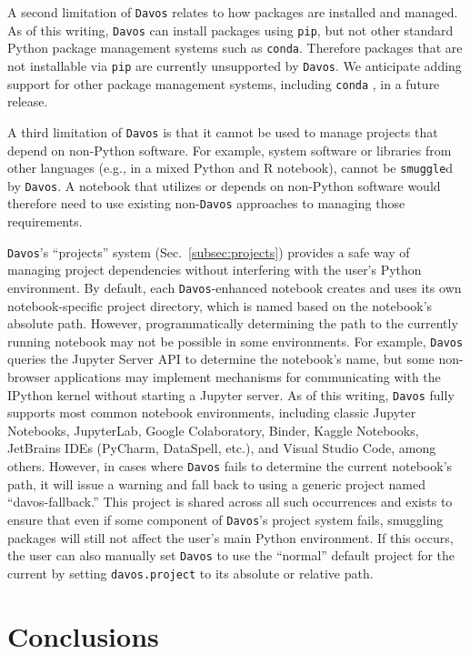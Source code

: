 \documentclass[preprint,12pt,a4paper]{elsarticle}
\begin{document}
A second limitation of \texttt{Davos} relates to how packages are installed and managed.
As of this writing, \texttt{Davos} can install packages using \texttt{pip}, but not
other standard Python package management systems such as \texttt{conda}.
Therefore packages that are not installable via \texttt{pip} are currently
unsupported by \texttt{Davos}. We anticipate adding support for other package management
systems, including \texttt{conda} \cite{Anac12}, in a future release.

A third limitation of \texttt{Davos} is that it cannot be used to manage projects that
depend on non-Python software. For example, system software or libraries from
other languages (e.g., in a mixed Python and R notebook), cannot be
\texttt{smuggle}d by \texttt{Davos}. A notebook that utilizes or depends on non-Python
software would therefore need to use existing non-\texttt{Davos} approaches to managing
those requirements.

\texttt{Davos}'s ``projects'' system (Sec.~\ref{subsec:projects}) provides a safe way
of managing project dependencies without interfering with the user's Python
environment. By default, each \texttt{Davos}-enhanced notebook creates and uses its own
notebook-specific project directory, which is named based on the notebook's absolute
path. However, programmatically determining the path to the currently running
notebook may not be possible in some environments.
For example, \texttt{Davos} queries the Jupyter Server API to determine the notebook's name, but some non-browser applications may implement mechanisms for communicating with the IPython kernel without starting a Jupyter server.
As of this writing, \texttt{Davos} fully supports most common notebook environments, including classic Jupyter Notebooks,
JupyterLab, Google Colaboratory, Binder, Kaggle Notebooks, JetBrains IDEs (PyCharm, DataSpell, etc.), and Visual Studio Code, among others.
However, in cases where \texttt{Davos} fails to determine the current notebook's path, it will issue a warning and fall back to using a generic project named ``davos-fallback.'' This project is shared across all such occurrences and exists to ensure that even if some component of \texttt{Davos}'s project system fails, smuggling packages will still not affect the user's main Python environment. If this occurs, the user can also manually set \texttt{Davos} to use the ``normal'' default project for the current by setting \texttt{davos.project} to its absolute or relative path.


\section{Conclusions}
\end{document}
